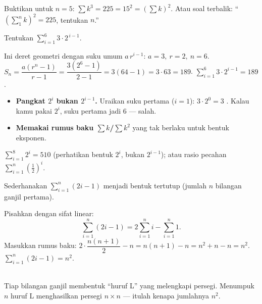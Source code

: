 \begin{variasi}
Buktikan untuk $n=5$: $\sum k^3=225=15^2=(\sum k)^2$. Atau soal terbalik:
``$(\sum_1^n k)^2=225$, tentukan $n$.''
\end{variasi}

\begin{soalbox}{}
Tentukan $\displaystyle\sum_{i=1}^{6}3\cdot2^{\,i-1}$.
\end{soalbox}

\jawab
{} Ini deret geometri dengan suku umum $a\,r^{i-1}$: $a=3,\ r=2,\ n=6$.
 $S_n=\dfrac{a(r^n-1)}{r-1}=\dfrac{3(2^6-1)}{2-1}=3(64-1)=3\cdot63=189$.
\jadi $\displaystyle\sum_{i=1}^{6}3\cdot2^{i-1}=189$.

\begin{jebakan}
\begin{itemize}[leftmargin=*,topsep=2pt]
  \item \textbf{Pangkat $2^i$ bukan $2^{i-1}$.} Uraikan suku pertama ($i=1$):
  $3\cdot2^0=3$ \checkmark. Kalau kamu pakai $2^i$, suku pertama jadi $6$ ---
  salah.
  \item \textbf{Memakai rumus baku $\sum k$/$\sum k^2$} yang tak berlaku untuk
  bentuk eksponen.
\end{itemize}
\end{jebakan}

\begin{variasi}
$\sum_{i=1}^{8}2^i=510$ (perhatikan bentuk $2^i$, bukan $2^{i-1}$); atau rasio
pecahan $\sum_{i=1}^{n}(\frac12)^{i}$.
\end{variasi}

\begin{soalbox}{}
Sederhanakan $\displaystyle\sum_{i=1}^{n}(2i-1)$ menjadi bentuk tertutup (jumlah
$n$ bilangan ganjil pertama).
\end{soalbox}

\jawab
{} Pisahkan dengan sifat linear:
\[
\sum_{i=1}^{n}(2i-1)=2\sum_{i=1}^{n}i-\sum_{i=1}^{n}1.
\]
 Masukkan rumus baku: $2\cdot\dfrac{n(n+1)}{2}-n=n(n+1)-n=n^2+n-n=n^2$.
\jadi $\displaystyle\sum_{i=1}^{n}(2i-1)=n^2$.

\begin{center}
\\
{\small Tiap bilangan ganjil membentuk ``huruf L'' yang melengkapi persegi.
Menumpuk $n$ huruf L menghasilkan persegi $n\times n$ --- itulah kenapa jumlahnya
$n^2$.}
\end{center}

